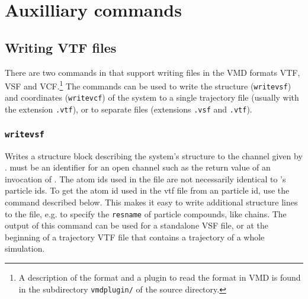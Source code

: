 \chapter{Auxilliary commands}
\label{chap:aux}

\section{Writing VTF files}

There are two commands in \es{} that support writing files in the VMD
formats VTF, VSF and VCF.\footnote{A description of the format and a
  plugin to read the format in VMD is found in the subdirectory
  \texttt{vmdplugin/} of the \es{} source directory.} The commands can
be used to write the structure (\texttt{writevsf}) and coordinates
(\texttt{writevcf}) of the system to a single trajectory file (usually
with the extension \texttt{.vtf}), or to separate files (extensions
\texttt{.vsf} and \texttt{.vtf}).

\subsection{\texttt{writevsf}}

{   
  }

Writes a structure block describing the system's structure to the
channel given by .  must be an
identifier for an open channel such as the return value of an
invocation of . The atom ids used in the file are not
necessarily identical to \es's particle ids. To get the atom id used
in the vtf file from an \es particle id, use the command
 described below. This makes it easy to write
additional structure lines to the file, e.g. to specify the
\texttt{resname} of particle compounds, like chains.  The output of
this command can be used for a standalone VSF file, or at the
beginning of a trajectory VTF file that contains a trajectory of a
whole simulation.

